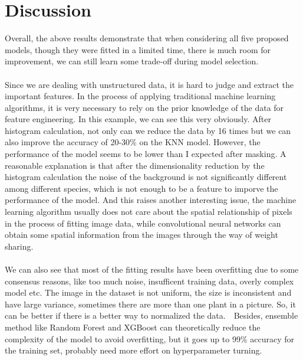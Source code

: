 \documentclass[11pt]{article}
\begin{document}
\section{Discussion}
Overall, the above results demonstrate that when considering all five proposed models, though they were fitted in a limited time, there is much room for improvement, we can still learn some trade-off during model selection.
\\
\\
Since we are dealing with unstructured data, it is hard to judge and extract the important features. In the process of applying traditional machine learning algorithms, it is very necessary to rely on the prior knowledge of the data for feature engineering. In this example, we can see this very obviously. After histogram calculation, not only can we reduce the data by 16 times but we can also improve the accuracy of 20-30\% on the KNN model. However, the performance of the model seems to be lower than I expected after masking. A reasonable explanation is that after the dimensionality reduction by the histogram calculation the noise of the background is not significantly different among different species, which is not enough to be a feature to imporve the performance of the model. And this raises another interesting issue, the machine learning algorithm usually does not care about the spatial relationship of pixels in the process of fitting image data, while convolutional neural networks can obtain some spatial information from the images through the way of weight sharing.  
\\
\\
We can also see that most of the fitting results have been overfitting due to some consensus reasons, like too much noise, insufficent training data, overly complex model etc. The image in the dataset is not uniform, the size is inconsistent and have large variance, sometimes there are more than one plant in a picture. So, it can be better if there is a better way to normalized the data.　Besides, ensemble method like Random Forest and XGBoost can theoretically reduce the complexity of the model to avoid overfitting, but it goes up to 99\% accuracy for the training set, probably need more effort on hyperparameter turning.




\end{document}
